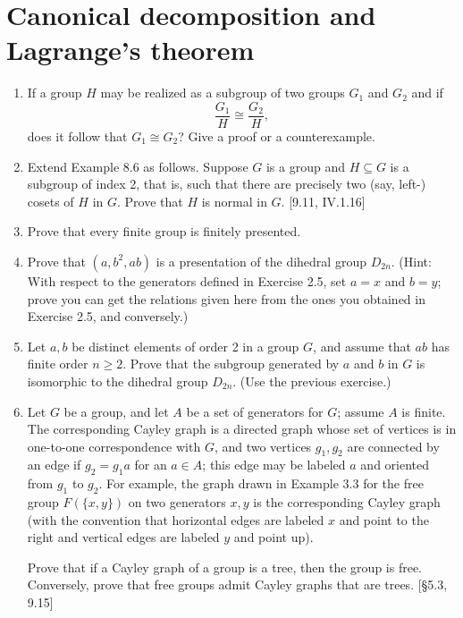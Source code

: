 \section{Canonical decomposition and Lagrange's theorem}
\begin{enumerate}
    \item If a group $H$ may be realized as a subgroup of two groups $G_1$ and $G_2$ and if
          \[ \frac{G_1}{H} \cong \frac{G_2}{H}, \]
          does it follow that $G_1 \cong G_2$? Give a proof or a counterexample.

    \item Extend Example 8.6 as follows. Suppose $G$ is a group and $H \subseteq G$ is a subgroup of index 2, that is, such that there are precisely two (say, left-) cosets of $H$ in $G$. Prove that $H$ is normal in $G$. [9.11, IV.1.16]

    \item Prove that every finite group is finitely presented.

    \item Prove that $(a, b^2, ab)$ is a presentation of the dihedral group $D_{2n}$. (Hint: With respect to the generators defined in Exercise 2.5, set $a=x$ and $b=y$; prove you can get the relations given here from the ones you obtained in Exercise 2.5, and conversely.)

    \item Let $a, b$ be distinct elements of order 2 in a group $G$, and assume that $ab$ has finite order $n \ge 2$. Prove that the subgroup generated by $a$ and $b$ in $G$ is isomorphic to the dihedral group $D_{2n}$. (Use the previous exercise.)

    \item Let $G$ be a group, and let $A$ be a set of generators for $G$; assume $A$ is finite. The corresponding Cayley graph is a directed graph whose set of vertices is in one-to-one correspondence with $G$, and two vertices $g_1, g_2$ are connected by an edge if $g_2 = g_1 a$ for an $a \in A$; this edge may be labeled $a$ and oriented from $g_1$ to $g_2$. For example, the graph drawn in Example 3.3 for the free group $F(\{x,y\})$ on two generators $x, y$ is the corresponding Cayley graph (with the convention that horizontal edges are labeled $x$ and point to the right and vertical edges are labeled $y$ and point up).

          Prove that if a Cayley graph of a group is a tree, then the group is free. Conversely, prove that free groups admit Cayley graphs that are trees. [\S5.3, 9.15]


\end{enumerate}
